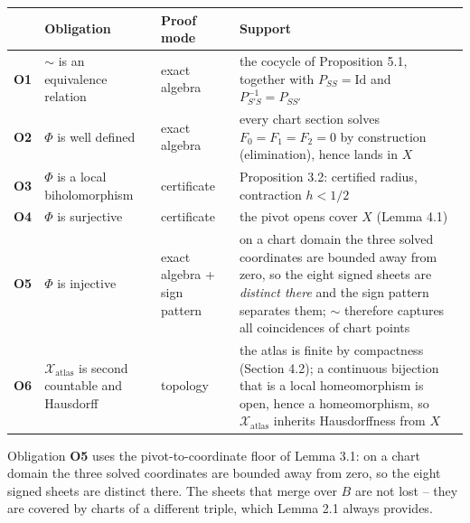 \begin{longtable}[]{@{}
  >{\raggedright\arraybackslash}p{}
  >{\raggedright\arraybackslash}p{}
  >{\raggedright\arraybackslash}p{}
  >{\raggedright\arraybackslash}p{}@{}}
\toprule\noalign{}
\begin{minipage}[b]{\linewidth}\raggedright
\end{minipage} & \begin{minipage}[b]{\linewidth}\raggedright
Obligation
\end{minipage} & \begin{minipage}[b]{\linewidth}\raggedright
Proof mode
\end{minipage} & \begin{minipage}[b]{\linewidth}\raggedright
Support
\end{minipage} \\
\midrule\noalign{}
\endhead
\bottomrule\noalign{}
\endlastfoot
\textbf{O1} & \(\sim\) is an equivalence relation & exact algebra & the cocycle of Proposition 5.1, together with \(P_{SS} = \mathrm{Id}\) and \(P_{S'S}^{-1} = P_{SS'}\) \\
\textbf{O2} & \(\Phi\) is well defined & exact algebra & every chart section solves \(F_0 = F_1 = F_2 = 0\) by construction (elimination), hence lands in \(X\) \\
\textbf{O3} & \(\Phi\) is a local biholomorphism & certificate & Proposition 3.2: certified radius, contraction \(h < 1/2\) \\
\textbf{O4} & \(\Phi\) is surjective & certificate & the pivot opens cover \(X\) (Lemma 4.1) \\
\textbf{O5} & \(\Phi\) is injective & exact algebra + sign pattern & on a chart domain the three solved coordinates are bounded away from zero, so the eight signed sheets are \emph{distinct there} and the sign pattern separates them; \(\sim\) therefore captures all coincidences of chart points \\
\textbf{O6} & \(\mathcal{X}_{\mathrm{atlas}}\) is second countable and Hausdorff & topology & the atlas is finite by compactness (Section 4.2); a continuous bijection that is a local homeomorphism is open, hence a homeomorphism, so \(\mathcal{X}_{\mathrm{atlas}}\) inherits Hausdorffness from \(X\) \\
\end{longtable}

Obligation \textbf{O5} uses the pivot-to-coordinate floor of Lemma 3.1: on a chart domain the three solved coordinates are bounded away from zero, so the eight signed sheets are distinct there. The sheets that merge over \(B\) are not lost -- they are covered by charts of a different triple, which Lemma 2.1 always provides.

